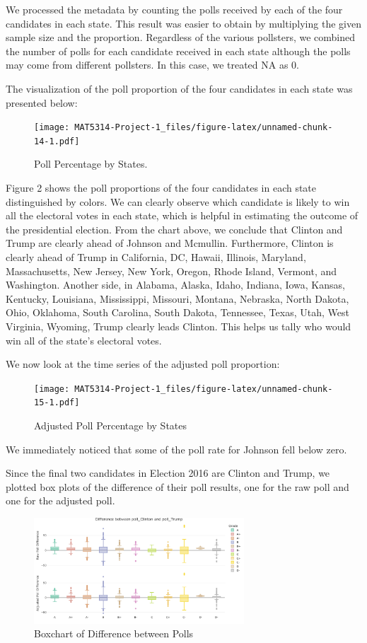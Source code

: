 \documentclass[
  12pt,
]{article}
\begin{document}
We processed the metadata by counting the polls received by each of the
four candidates in each state. This result was easier to obtain by
multiplying the given sample size and the proportion. Regardless of the
various pollsters, we combined the number of polls for each candidate
received in each state although the polls may come from different
pollsters. In this case, we treated NA as 0.

The visualization of the poll proportion of the four candidates in each
state was presented below:

\begin{figure}
\centering
\texttt{[image: MAT5314-Project-1\_files/figure-latex/unnamed-chunk-14-1.pdf]}
\caption{Poll Percentage by States.}
\end{figure}

Figure 2 shows the poll proportions of the four candidates in each state
distinguished by colors. We can clearly observe which candidate is
likely to win all the electoral votes in each state, which is helpful in
estimating the outcome of the presidential election. From the chart
above, we conclude that Clinton and Trump are clearly ahead of Johnson
and Mcmullin. Furthermore, Clinton is clearly ahead of Trump in
California, DC, Hawaii, Illinois, Maryland, Massachusetts, New Jersey,
New York, Oregon, Rhode Island, Vermont, and Washington. Another side,
in Alabama, Alaska, Idaho, Indiana, Iowa, Kansas, Kentucky, Louisiana,
Mississippi, Missouri, Montana, Nebraska, North Dakota, Ohio, Oklahoma,
South Carolina, South Dakota, Tennessee, Texas, Utah, West Virginia,
Wyoming, Trump clearly leads Clinton. This helps us tally who would win
all of the state's electoral votes.

We now look at the time series of the adjusted poll proportion:

\begin{figure}
\centering
\texttt{[image: MAT5314-Project-1\_files/figure-latex/unnamed-chunk-15-1.pdf]}
\caption{Adjusted Poll Percentage by States}
\end{figure}

We immediately noticed that some of the poll rate for Johnson fell below
zero.

Since the final two candidates in Election 2016 are Clinton and Trump,
we plotted box plots of the difference of their poll results, one for
the raw poll and one for the adjusted poll.

\begin{figure}
\centering
\includegraphics[width=0.7\textwidth,height=\textheight]{./Figures/boxchart.png}
\caption{Boxchart of Difference between Polls}
\end{figure}
\end{document}
